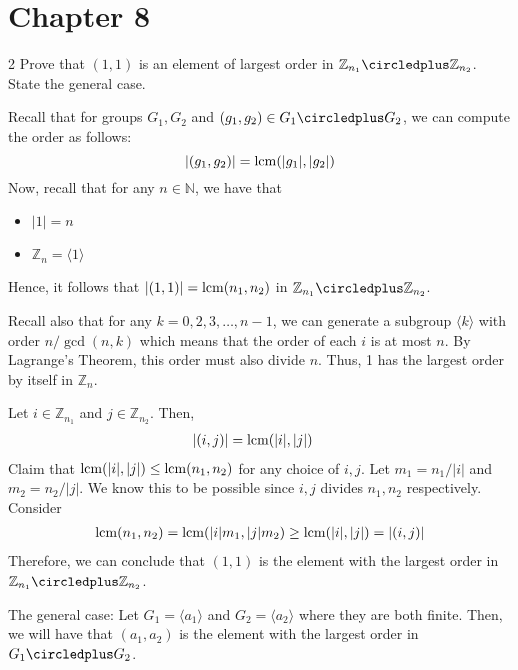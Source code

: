 \section*{Chapter 8}

\begin{hwproblem}
{2}{
    Prove that \((1, 1)\) is an element of largest order in \(\mathbb{Z}_{n_1} \circledplus \mathbb{Z}_{n_2}\). State the general case.
}

Recall that for groups \(G_1, G_2\) and \((g_1, g_2) \in G_1 \circledplus G_2\), we can compute the order as follows:
\[
    |(g_1, g_2)| = \operatorname{lcm}(|g_1|, |g_2|)
\]
Now, recall that for any \(n \in \mathbb{N}\), we have that
\begin{itemize}
    \item \(|1| = n\)
    \item \(\mathbb{Z}_n = \langle 1 \rangle\)
\end{itemize}
Hence, it follows that \(|(1, 1)| = \operatorname{lcm}(n_1, n_2)\) in \(\mathbb{Z}_{n_1} \circledplus \mathbb{Z}_{n_2}\).

Recall also that for any \(k = 0, 2, 3, \ldots, n-1\), we can generate a subgroup \(\langle k \rangle\) with order \(n / \gcd(n, k)\) which means that the order of each \(i\) is at most \(n\). By Lagrange's Theorem, this order must also divide \(n\). Thus, 1 has the largest order by itself in \(\mathbb{Z}_n\).

Let \(i \in \mathbb{Z}_{n_1}\) and \(j \in \mathbb{Z}_{n_2}\). Then,
\[
\begin{aligned}
    |(i, j)| &= \operatorname{lcm}(|i|, |j|)
\end{aligned}
\]
Claim that \(\operatorname{lcm}(|i|, |j|) \leq \operatorname{lcm}(n_1, n_2)\) for any choice of \(i, j\). Let \(m_1 = n_1 / |i|\) and \(m_2 = n_2 / |j|\). We know this to be possible since \(i, j\) divides \(n_1, n_2\) respectively. Consider
\[
\begin{aligned}
    \operatorname{lcm}(n_1, n_2) = \operatorname{lcm}(|i|m_1, |j|m_2) \geq \operatorname{lcm}(|i|, |j|) = |(i, j)|
\end{aligned}
\]
Therefore, we can conclude that \((1, 1)\) is the element with the largest order in \(\mathbb{Z}_{n_1}\circledplus\mathbb{Z}_{n_2}\).

The general case: Let \(G_1 = \langle a_1 \rangle\) and \(G_2 = \langle a_2 \rangle\) where they are both finite. Then, we will have that \((a_1, a_2)\) is the element with the largest order in \(G_1 \circledplus G_2\).

\end{hwproblem}

